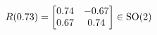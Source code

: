 \documentclass[preview]{standalone}
\begin{document}
\begin{align*}
\special{dvisvgm:raw <g id='unique000'>}R(0.73) = \begin{bmatrix} 0.74 & -0.67 \\ 0.67 & 0.74 \end{bmatrix} \in \text{SO}(2)\special{dvisvgm:raw </g>}
\end{align*}
\end{document}
